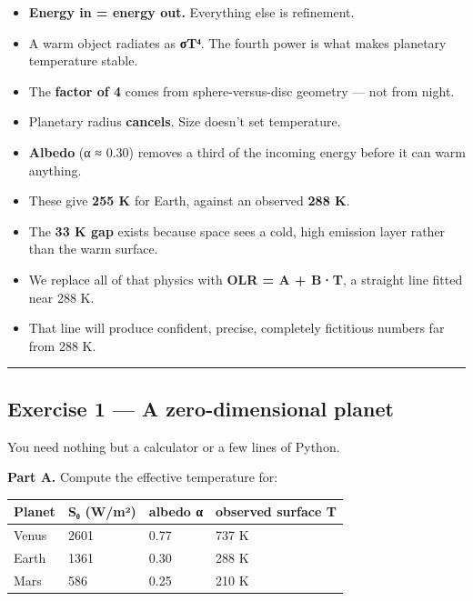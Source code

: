 \begin{itemize}
\tightlist
\item
  \textbf{Energy in = energy out.} Everything else is refinement.
\item
  A warm object radiates as \textbf{σT⁴}. The fourth power is what makes
  planetary temperature stable.
\item
  The \textbf{factor of 4} comes from sphere-versus-disc geometry ---
  not from night.
\item
  Planetary radius \textbf{cancels}. Size doesn't set temperature.
\item
  \textbf{Albedo} (α ≈ 0.30) removes a third of the incoming energy
  before it can warm anything.
\item
  These give \textbf{255 K} for Earth, against an observed \textbf{288
  K}.
\item
  The \textbf{33 K gap} exists because space sees a cold, high emission
  layer rather than the warm surface.
\item
  We replace all of that physics with \textbf{OLR = A + B·T}, a straight
  line fitted near 288 K.
\item
  That line will produce confident, precise, completely fictitious
  numbers far from 288 K.
\end{itemize}

\begin{center}\rule{0.5\linewidth}{0.5pt}\end{center}

\subsection{Exercise 1 --- A zero-dimensional
planet}\label{exercise-1-a-zero-dimensional-planet}

You need nothing but a calculator or a few lines of Python.

\textbf{Part A.} Compute the effective temperature for:

\begin{longtable}[]{@{}llll@{}}
\toprule\noalign{}
Planet & S₀ (W/m²) & albedo α & observed surface T \\
\midrule\noalign{}
\endhead
\bottomrule\noalign{}
\endlastfoot
Venus & 2601 & 0.77 & 737 K \\
Earth & 1361 & 0.30 & 288 K \\
Mars & 586 & 0.25 & 210 K \\
\end{longtable}

